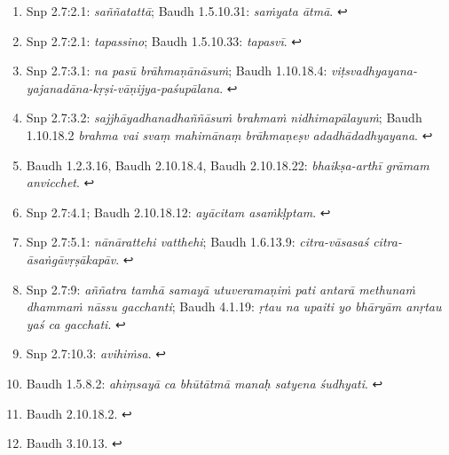\documentclass[12pt,openany]{book}%
\begin{document}
\begin{enumerate}
%
\item Snp 2.7:2.1: \textit{\textsanskrit{saññatattā}}; Baudh 1.5.10.31: \textit{\textsanskrit{saṁyata} \textsanskrit{ātmā}}. ↩

%
\item Snp 2.7:2.1: \textit{tapassino}; Baudh 1.5.10.33: \textit{\textsanskrit{tapasvī}}. ↩

%
\item Snp 2.7:3.1: \textit{na \textsanskrit{pasū} \textsanskrit{brāhmaṇānāsuṁ}}; Baudh 1.10.18.4: \textit{\textsanskrit{viṭsvadhyayana}-\textsanskrit{yajanadāna}-\textsanskrit{kṛṣi}-\textsanskrit{vāṇijya}-\textsanskrit{paśupālana}}. ↩

%
\item Snp 2.7:3.2: \textit{\textsanskrit{sajjhāyadhanadhaññāsuṁ} \textsanskrit{brahmaṁ} \textsanskrit{nidhimapālayuṁ}}; Baudh 1.10.18.2 \textit{brahma vai svaṃ \textsanskrit{mahimānaṃ} \textsanskrit{brāhmaṇeṣv} \textsanskrit{adadhādadhyayana}}. ↩

%
\item Baudh 1.2.3.16, Baudh 2.10.18.4, Baudh 2.10.18.22: \textit{\textsanskrit{bhaikṣa}-\textsanskrit{arthī} \textsanskrit{grāmam} anvicchet}. ↩

%
\item Snp 2.7:4.1; Baudh 2.10.18.12: \textit{\textsanskrit{ayācitam} \textsanskrit{asaṁkḷptam}}. ↩

%
\item Snp 2.7:5.1: \textit{\textsanskrit{nānārattehi} vatthehi}; Baudh 1.6.13.9: \textit{citra-\textsanskrit{vāsasaś} citra-\textsanskrit{āsaṅgāvṛṣākapāv}}. ↩

%
\item Snp 2.7:9: \textit{\textsanskrit{aññatra} \textsanskrit{tamhā} \textsanskrit{samayā} \textsanskrit{utuveramaṇiṁ} pati \textsanskrit{antarā} \textsanskrit{methunaṁ} \textsanskrit{dhammaṁ} \textsanskrit{nāssu} gacchanti}; Baudh 4.1.19: \textit{\textsanskrit{ṛtau} na upaiti yo \textsanskrit{bhāryām} \textsanskrit{anṛtau} \textsanskrit{yaś} ca gacchati}. ↩

%
\item Snp 2.7:10.3: \textit{\textsanskrit{avihiṁsa}}. ↩

%
\item Baudh 1.5.8.2: \textit{\textsanskrit{ahiṃsayā} ca \textsanskrit{bhūtātmā} manaḥ satyena \textsanskrit{śudhyati}}. ↩

%
\item Baudh 2.10.18.2. ↩

%
\item Baudh 3.10.13. ↩


\end{enumerate}
\end{document}
